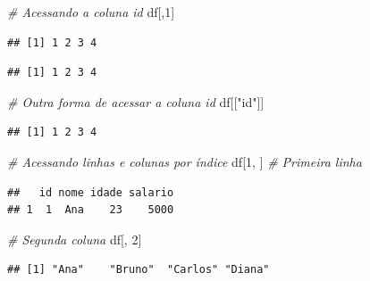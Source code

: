 \documentclass[
]{book}
\newenvironment{Shaded}{\begin{snugshade}}{\end{snugshade}}
\newcommand{\CommentTok}[1]{\textcolor[rgb]{0.56,0.35,0.01}{\textit{#1}}}
\newcommand{\DecValTok}[1]{\textcolor[rgb]{0.00,0.00,0.81}{#1}}
\newcommand{\NormalTok}[1]{#1}
\newcommand{\SpecialCharTok}[1]{\textcolor[rgb]{0.81,0.36,0.00}{\textbf{#1}}}
\newcommand{\StringTok}[1]{\textcolor[rgb]{0.31,0.60,0.02}{#1}}
\theoremstyle{definition}
\theoremstyle{definition}
\theoremstyle{definition}
\theoremstyle{definition}
\theoremstyle{remark}
\begin{document}
\begin{Shaded}
\begin{Highlighting}[]
\CommentTok{\# Acessando a coluna id}
\NormalTok{df[,}\DecValTok{1}\NormalTok{]}
\end{Highlighting}
\end{Shaded}

\begin{verbatim}
## [1] 1 2 3 4
\end{verbatim}

\begin{Shaded}
\end{Shaded}

\begin{verbatim}
## [1] 1 2 3 4
\end{verbatim}

\begin{Shaded}
\begin{Highlighting}[]
\CommentTok{\# Outra forma de acessar a coluna id}
\NormalTok{df[[}\StringTok{"id"}\NormalTok{]]}
\end{Highlighting}
\end{Shaded}

\begin{verbatim}
## [1] 1 2 3 4
\end{verbatim}

\begin{Shaded}
\begin{Highlighting}[]
\CommentTok{\# Acessando linhas e colunas por índice}
\NormalTok{df[}\DecValTok{1}\NormalTok{, ] }\CommentTok{\# Primeira linha}
\end{Highlighting}
\end{Shaded}

\begin{verbatim}
##   id nome idade salario
## 1  1  Ana    23    5000
\end{verbatim}

\begin{Shaded}
\begin{Highlighting}[]
\CommentTok{\# Segunda coluna}
\NormalTok{df[, }\DecValTok{2}\NormalTok{] }
\end{Highlighting}
\end{Shaded}

\begin{verbatim}
## [1] "Ana"    "Bruno"  "Carlos" "Diana"
\end{verbatim}
\end{document}
